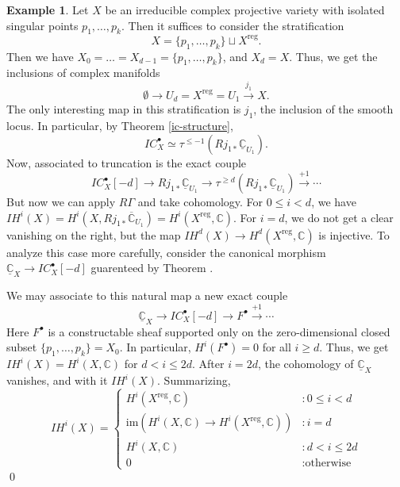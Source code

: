 \documentclass[12pt]{amsart}
\newcommand{\C}{\mathbb{C}}
\theoremstyle{definition}
\newtheorem{example}[theorem]{Example}
\theoremstyle{remark}
\numberwithin{equation}{section}
\begin{document}
\begin{example}
Let $X$ be an irreducible complex projective variety with isolated singular points $p_1,\dots, p_k$. Then it suffices to consider the stratification
\[ X = \{p_1,\dots,p_k\} \sqcup X^{\text{reg}}. \]
Then we have \(X_0 = \dots = X_{d-1} = \{p_1,\dots, p_k\}\), and \(X_d = X\). Thus, we get the inclusions of complex manifolds
\[ \emptyset \to U_d = X^{\text{reg}} = U_1 \overset{j_1}{\to} X.\]
The only interesting map in this stratification is $j_1$, the inclusion of the smooth locus. In particular, by Theorem \ref{ic-structure},
\[ IC_X^\bullet \simeq \tau^{\leq -1}\left(Rj_{1*} \underline{\C}_{U_1}\right). \] 
Now, associated to truncation is the exact couple
\begin{equation}
    IC_X^\bullet[-d] \to Rj_{1*} \underline{\C}_{U_1} \to 
    \tau^{\geq d}\left(Rj_{1*} \underline{\C}_{U_1}\right) \overset{+1}{\to} \cdots
\end{equation}
But now we can apply $R\Gamma$ and take cohomology. For $0 \leq i < d$, we have
\( IH^i(X) = H^i(X, Rj_{1*}\overline{\C}_{U_1}) = H^i(X^{\text{reg}}, \C). \) For $i=d$, we do not get a clear vanishing on the right, but the map
\(IH^d(X) \to H^d(X^{\text{reg}}, \C)\) is injective. To analyze this case more carefully, consider the canonical morphism
\( \underline{\C}_X \to IC_X^\bullet[-d] \)
guarenteed by Theorem .

We may associate to this natural map a new exact couple
\begin{equation}
    \underline{\C}_X \to IC_X^\bullet[-d] \to F^\bullet \overset{+1}{\to} \cdots
\end{equation}
Here \(F^\bullet\) is a constructable sheaf supported only on the zero-dimensional closed subset $\{p_1, \dots, p_k\} = X_0$. In particular, \(H^i(F^\bullet) = 0\) for all $i \geq d$. Thus, we get \(IH^i(X) = H^i(X, \C)\) for $d < i \leq 2d$. After $i = 2d$, the cohomology of $\underline{\C}_X$ vanishes, and with it $IH^i(X)$. Summarizing,
\begin{equation}
    IH^i(X) = \begin{cases}
        H^i(X^{\text{reg}}, \C) & : 0 \leq i < d \\
        \text{im}(H^i(X, \C) \to H^i(X^{\text{reg}}, \C)) & : i = d \\
        H^i(X, \C) & : d < i \leq 2d \\
        0 & : \text{otherwise}
    \end{cases}
\end{equation}
\qed
\end{example}




\end{document}
